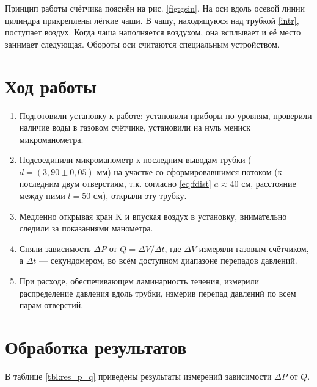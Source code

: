 \documentclass[12pt]{article}
\begin{document}
	Принцип работы счётчика пояснён на рис. \ref{fig:gsin}. На оси вдоль осевой линии цилиндра прикреплены лёгкие чаши. В чашу, находящуюся над трубкой \ref{intr}, поступает воздух. Когда чаша наполняется воздухом, она всплывает и её место занимает следующая. Обороты оси считаются специальным устройством.
	
	\section*{Ход работы}
	
	\begin{enumerate}
		\item Подготовили установку к работе: установили приборы по уровням, проверили наличие воды в газовом счётчике, установили на нуль мениск микроманометра.
		\item Подсоединили микроманометр к последним выводам трубки ($d = \left(3{,}90\pm 0{,}05 \right)$ мм) на участке со сформировавшимся потоком (к последним двум отверстиям, т.к. согласно \eqref{eq:fdist} $a \approx 40$ см, расстояние между ними $l=50$ см), открыли эту трубку.
		\item Медленно открывая кран K и впуская воздух в установку, внимательно следили за показаниями манометра.
		\item Сняли зависимость $\Delta P$ от $Q=\Delta V /\Delta t$, где $\Delta V$ измеряли газовым счётчиком, а $\Delta t$ --- секундомером, во всём доступном диапазоне перепадов давлений.
		\item При расходе, обеспечивающем ламинарность течения, измерили распределение давления вдоль трубки, измерив перепад давлений по всем парам отверстий.
	\end{enumerate}
	
	\section*{Обработка результатов}
	
	В таблице \ref{tbl:res_p_q} приведены результаты измерений зависимости $\Delta P$ от $Q$.
	
\end{document}
